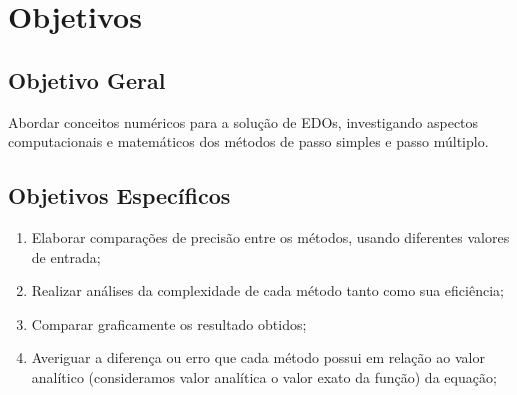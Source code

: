\section{Objetivos}\label{lobjetivos}
\subsection{Objetivo Geral}
Abordar conceitos numéricos para a solução de EDOs, investigando aspectos 
computacionais e matemáticos dos métodos de passo simples e passo múltiplo.
\subsection{Objetivos Específicos}
\begin{enumerate}[label=\roman*.]
\item Elaborar comparações de precisão entre os métodos, usando diferentes valores de entrada;
\item Realizar análises da complexidade de cada método tanto como sua eficiência;
\item Comparar graficamente os resultado obtidos;
\item Averiguar a diferença ou erro que cada método possui em relação ao valor analítico (consideramos valor analítica o valor exato da função) da equação;
\end{enumerate}

